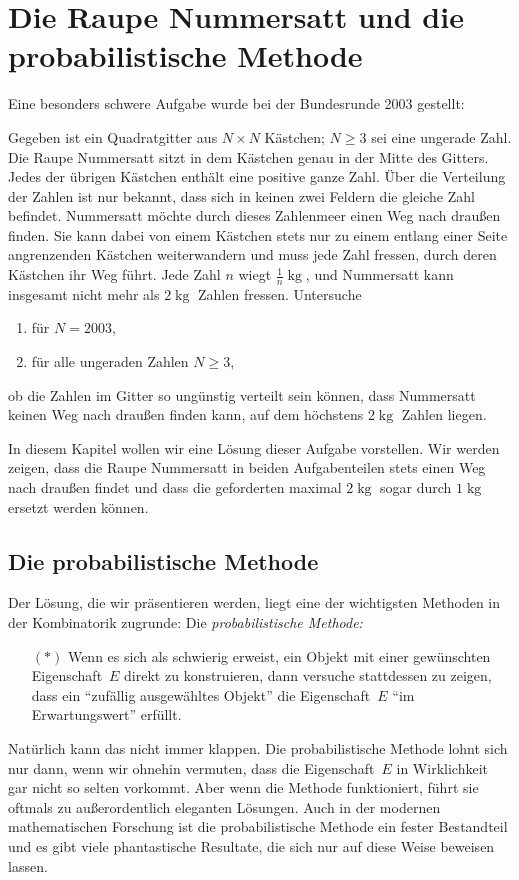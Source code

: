 \section{Die Raupe Nummersatt und die probabilistische Methode}
Eine besonders schwere Aufgabe wurde bei der Bundesrunde 2003 gestellt:

\begin{aufgabe*}[***]\label{aufgabe:RaupeNummersatt}
	Gegeben ist ein Quadratgitter aus $N \times N$ Kästchen; $N\geqslant 3$ sei eine ungerade Zahl.
	Die Raupe Nummersatt sitzt in dem Kästchen genau in der Mitte des Gitters. Jedes der übrigen
	Kästchen enthält eine positive ganze Zahl. Über die Verteilung der Zahlen ist nur bekannt, dass
	sich in keinen zwei Feldern die gleiche Zahl befindet.
	Nummersatt möchte durch dieses Zahlenmeer einen Weg nach draußen finden. Sie kann dabei
	von einem Kästchen stets nur zu einem entlang einer Seite angrenzenden Kästchen weiterwandern
	und muss jede Zahl fressen, durch deren Kästchen ihr Weg führt. Jede Zahl $n$ wiegt $\frac{1}{n}\operatorname{kg}$, und
	Nummersatt kann insgesamt nicht mehr als $2\operatorname{kg}$ Zahlen fressen.
	Untersuche
	\begin{enumerate}[label={$(\alph*)$},ref={$(\alph*)$}]
		\item für $N = 2003$,
		\item für alle ungeraden Zahlen $N\geqslant 3$,
	\end{enumerate}
	ob die Zahlen im Gitter so ungünstig verteilt sein können, dass Nummersatt keinen Weg nach
	draußen finden kann, auf dem höchstens $2\operatorname{kg}$ Zahlen liegen.
\end{aufgabe*}

In diesem Kapitel wollen wir eine Lösung dieser Aufgabe vorstellen. Wir werden zeigen, dass die Raupe Nummersatt in beiden Aufgabenteilen stets einen Weg nach draußen findet und dass die geforderten maximal $2\operatorname{kg}$ sogar durch $1\operatorname{kg}$ ersetzt werden können.

\subsection*{Die probabilistische Methode}

Der Lösung, die wir präsentieren werden, liegt eine der wichtigsten Methoden in der Kombinatorik zugrunde: Die \emph{probabilistische Methode:}
\begin{enumerate}\itshape
	\item[$(*)$] Wenn es sich als schwierig erweist, ein Objekt mit einer gewünschten Eigenschaft~$E$ direkt zu konstruieren, dann versuche stattdessen zu zeigen, dass ein \enquote{zufällig ausgewähltes Objekt} die Eigenschaft~$E$ \enquote{im Erwartungswert} erfüllt.
\end{enumerate}
Natürlich kann das nicht immer klappen. Die probabilistische Methode lohnt sich nur dann, wenn wir ohnehin vermuten, dass die Eigenschaft~$E$ in Wirklichkeit gar nicht so selten vorkommt. Aber wenn die Methode funktioniert, führt sie oftmals zu außerordentlich eleganten Lösungen. Auch in der modernen mathematischen Forschung ist die probabilistische Methode ein fester Bestandteil und es gibt viele phantastische Resultate, die sich nur auf diese Weise beweisen lassen.

